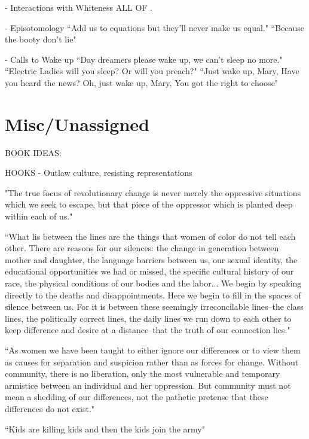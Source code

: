 \documentclass[a4paper, 11pt]{article} %
\begin{document}
- Interactions with Whiteness
ALL OF \cite{favoritefugitive}.

- Episotomology
``Add us to equations but they'll never make us equal."\cite{queen}
``Because the booty don't lie"\cite{queen}

- Calls to Wake up
``Day dreamers please wake up, we can't sleep no more."\cite{sincerelyjane}
``Electric Ladies will you sleep? Or will you preach?"\cite{queen}
``Just wake up, Mary, Have you heard the news? Oh, just wake up, Mary, You got the right to choose"\cite{sallyride}




\section*{Misc/Unassigned}

BOOK IDEAS:

HOOKS - Outlaw culture, resisting representations

"The true focus of revolutionary change is never merely the oppressive situations which we seek to escape, but that piece of the oppressor which is planted deep within each of us."\cite{lordredefiningdifference} 

``What lis between the lines are the things that women of color do not tell each other. There are reasons for our silences: the change in generation between mother and daughter, the language barriers between us, our sexual identity, the educational opportunities we had or missed, the specific cultural history of our race, the physical conditions of our bodies and the labor... We begin by speaking directly to the deaths and disappointments. Here we begin to fill in the spaces of silence between us. For it is between these seemingly irreconcilable lines--the class lines, the politically correct lines, the daily lines we run down to each other to keep difference and desire at a distance--that the truth of our connection lies."\cite{thebridge}

``As women we have been taught to either ignore our differences or to view them as causes for separation and suspicion rather than as forces for change. Without community, there is no liberation, only the most vulnerable and temporary armistice between an individual and her oppression. But community must not mean a shedding of our differences, not the pathetic pretense that these differences do not exist."\cite{lorde2003master}

``Kids are killing kids and then the kids join the army"\cite{danceordie}
\end{document}
